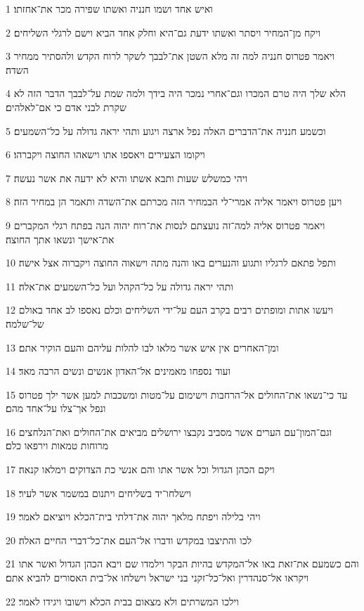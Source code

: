 \par 1 ואיש אחד ושמו חנניה ואשתו שפירה מכר את־אחזתו׃
\par 2 ויקח מן־המחיר ויסתר ואשתו ידעת גם־היא וחלק אחד הביא וישם לרגלי השליחים׃
\par 3 ויאמר פטרוס חנניה למה זה מלא השטן את־לבבך לשקר לרוח הקדש ולהסתיר ממחיר השדה׃
\par 4 הלא שלך היה טרם המכרו וגם־אחרי נמכר היה בידך ולמה שמת על־לבבך הדבר הזה לא שקרת לבני אדם כי אם־לאלהים׃
\par 5 וכשמע חנניה את־הדברים האלה נפל ארצה ויגוע ותהי יראה גדולה על כל־השמעים׃
\par 6 ויקומו הצעירים ויאספו אתו וישאהו החוצה ויקברהו׃
\par 7 ויהי כמשלש שעות ותבא אשתו והיא לא ידעה את אשר נעשה׃
\par 8 ויען פטרוס ויאמר אליה אמרי־לי הבמחיר הזה מכרתם את־השדה ותאמר הן במחיר הזה׃
\par 9 ויאמר פטרוס אליה למה־זה נועצתם לנסות את־רוח יהוה הנה בפתח רגלי המקברים את־אישך ונשאו אתך החוצה׃
\par 10 ותפל פתאם לרגליו ותגוע והנערים באו והנה מתה וישאוה החוצה ויקברוה אצל אישה׃
\par 11 ותהי יראה גדולה על כל־הקהל ועל כל־השמעים את־אלה׃
\par 12 ויעשו אתות ומופתים רבים בקרב העם על־ידי השליחים וכלם נאספו לב אחד באולם של־שלמה׃
\par 13 ומן־האחרים אין איש אשר מלאו לבו להלות עליהם והעם הוקיר אתם׃
\par 14 ועוד נספחו מאמינים אל־האדון אנשים ונשים הרבה מאד׃
\par 15 עד כי־נשאו את־החולים אל־הרחבות וישימום על־מטות ומשכבות למען אשר ילך פטרוס ונפל אך־צלו על־אחד מהם׃
\par 16 וגם־המון־עם הערים אשר מסביב נקבצו ירושלים מביאים את־החולים ואת־הנלחצים מרוחות טמאות וירפאו כלם׃
\par 17 ויקם הכהן הגדול וכל אשר אתו והם אנשי כת הצדוקים וימלאו קנאה׃
\par 18 וישלחו־יד בשליחים ויתנום במשמר אשר לעיר׃
\par 19 ויהי בלילה ויפתח מלאך יהוה את־דלתי בית־הכלא ויוציאם לאמר׃
\par 20 לכו והתיצבו במקדש ודברו אל־העם את־כל־דברי החיים האלה׃
\par 21 והם כשמעם את־זאת באו אל־המקדש בהיות הבקר וילמדו שם ויבא הכהן הגדול ואשר אתו ויקראו אל־סנהדרין ואל־כל־זקני בני ישראל וישלחו אל־בית האסורים להביא אתם׃
\par 22 וילכו המשרתים ולא מצאום בבית הכלא וישובו ויגידו לאמר׃
